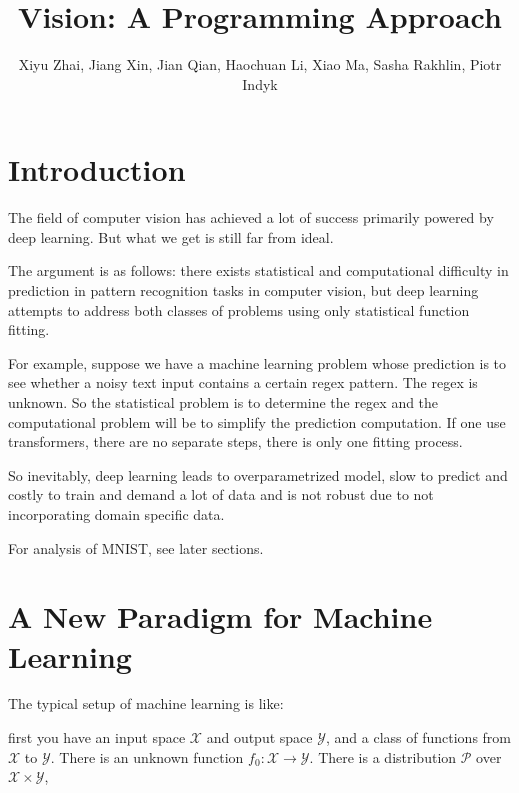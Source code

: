 \documentclass[11pt, oneside]{article}   	%
\title{Vision: A Programming Approach}
\author{Xiyu Zhai, Jiang Xin, Jian Qian, Haochuan Li, Xiao Ma, Sasha Rakhlin, Piotr Indyk}
\date{}							%
\theoremstyle{definition}
\begin{document}
\maketitle
\tableofcontents
{}

\section{Introduction}

The field of computer vision has achieved a lot of success primarily powered by deep learning. But what we get is still far from ideal.

The argument is as follows: there exists statistical and computational difficulty in prediction in pattern recognition tasks in computer vision, but deep learning attempts to address both classes of problems using only statistical function fitting.

For example, suppose we have a machine learning problem whose prediction is to see whether a noisy text input contains a certain regex pattern. The regex is unknown. So the statistical problem is to determine the regex and the computational problem will be to simplify the prediction computation. If one use transformers, there are no separate steps, there is only one fitting process.

So inevitably, deep learning leads to overparametrized model, slow to predict and costly to train and demand a lot of data and is not robust due to not incorporating domain specific data.

For analysis of MNIST, see later sections.



\section{A New Paradigm for Machine Learning}

The typical setup of machine learning is like:

first you have an input space $\mathcal{X}$ and output space $\mathcal{Y}$, and a class of functions from $\mathcal{X}$ to $\mathcal{Y}$. There is an unknown function $f_0:\mathcal{X}\to \mathcal{Y}$. There is a distribution $\mathcal{P}$ over $\mathcal{X}\times \mathcal{Y}$,
\end{document}

